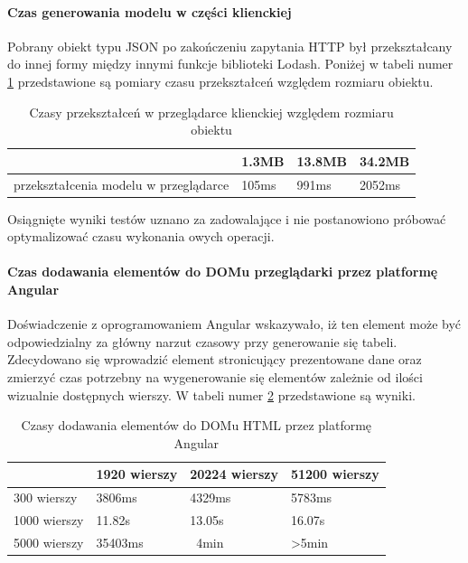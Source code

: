 \documentclass[a4paper,12pt,twoside]{article}
\begin{document}
\paragraph{Czas generowania modelu w części klienckiej} Pobrany obiekt typu JSON
po zakończeniu zapytania HTTP był przekształcany do innej formy między innymi
funkcje biblioteki Lodash. Poniżej w tabeli numer \ref{table:lodashTime} przedstawione są pomiary czasu przekształceń względem rozmiaru obiektu.

\begin{table} [H]
\begin{tabular}{| p{3cm} | p{3cm} | p{3cm} | p{3cm}|}
\hline
&  1.3MB&13.8MB& 34.2MB\\ 
\hline
przekształcenia modelu w przeglądarce& 105ms & 991ms& 2052ms\\ \hline  
\end{tabular}
\caption{Czasy przekształceń w przeglądarce klienckiej względem rozmiaru obiektu}
\label{table:lodashTime}
\end{table}
Osiągnięte wyniki testów uznano za zadowalające i nie postanowiono 
próbować optymalizować czasu wykonania owych operacji.

\paragraph{Czas dodawania elementów do DOMu przeglądarki przez platformę Angular}
Doświadczenie z oprogramowaniem Angular wskazywało, iż ten element może być odpowiedzialny za główny narzut czasowy przy generowanie się tabeli.
Zdecydowano się wprowadzić element stronicujący prezentowane dane oraz 
zmierzyć czas potrzebny na wygenerowanie się elementów zależnie od ilości 
wizualnie dostępnych wierszy. W tabeli numer \ref{table:tableRender} przedstawione są 
wyniki.

\begin{table} [H]
\begin{tabular}{| p{3cm} | p{3cm} | p{3cm} | p{3cm}|}
\hline
& 1920 wierszy &  20224 wierszy & 51200 wierszy\\ 
\hline
300 wierszy& 3806ms & 4329ms& 5783ms\\ \hline  
1000 wierszy& 11.82s & 13.05s& 16.07s\\ \hline  
5000 wierszy& 35403ms & ~4min& >5min\\ \hline  
\end{tabular}
\caption{Czasy dodawania elementów do DOMu HTML przez platformę Angular}
\label{table:tableRender}
\end{table}
\newpage
\end{document}
